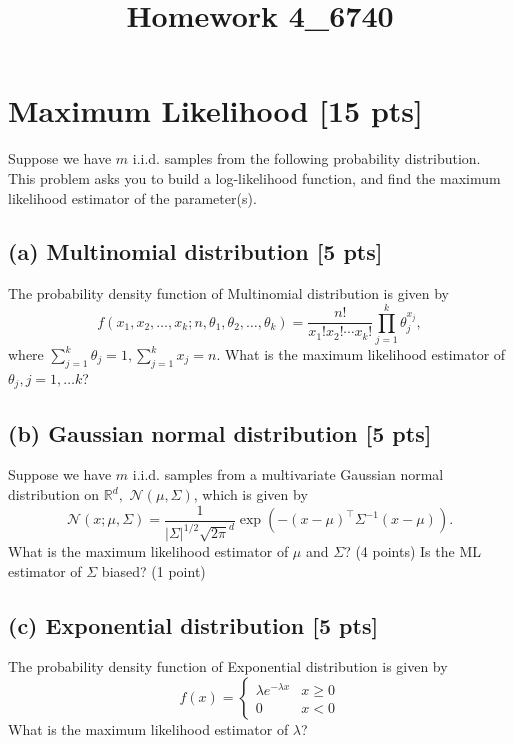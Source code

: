 \documentclass[12pt]{article}
\title{Homework 4_6740}
\begin{document}
\MakeScribeTop
\section{Maximum Likelihood [15 pts]}

Suppose we have $m$ i.i.d. samples from the following probability distribution. This
problem asks you to build a log-likelihood function, and find the
maximum likelihood estimator of the parameter(s).

\subsection*{(a) Multinomial distribution [5 pts]}
The probability density function of Multinomial distribution is given by 
$$f(x_1,x_2,\dots,x_k;n,\theta_1,\theta_2,\dots,\theta_k)=\frac{n!}{x_1!x_2!\cdots x_k!}\prod_{j=1}^{k}\theta_j^{x_j},$$
where $\sum_{j=1}^k\theta_j=1,\sum_{j=1}^k x_j=n$. What is the maximum likelihood estimator of $\theta_j, j=1,\dots k$?

\subsection*{(b) Gaussian normal distribution [5 pts]}
Suppose we have $m$ i.i.d. samples from a multivariate Gaussian normal distribution on $\mathbb{R}^d,$ 
$\mathcal{N}(\mu, \Sigma)$, which is given by
\begin{equation}
	\mathcal{N}(x; \mu, \Sigma) = \frac{1}{|\Sigma|^{1/2} \sqrt{2\pi}^d} \exp
	\left( - (x - \mu)^\top \Sigma^{-1} (x - \mu)\right).\nonumber
\end{equation}
What is the maximum likelihood estimator of $\mu$ and $\Sigma$? (4 points) Is the ML estimator of $\Sigma$ biased? (1 point)
\vspace{1cm}

\subsection*{(c) Exponential distribution [5 pts]}
The probability density function of Exponential distribution is
given by
\begin{equation} \nonumber
f(x) = \left\{\begin{matrix}
\lambda e^{-\lambda x} & x \ge 0\\
0 & x < 0
\end{matrix}\right.
\end{equation}
What is the maximum likelihood estimator of $\lambda$?
\end{document}
